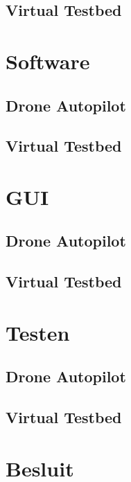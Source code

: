 \documentclass[eind]{penoverslag}
\begin{document}
\subsection{Virtual Testbed}



\section{Software}
\label{sec:Software}



\subsection{Drone Autopilot}



\subsection{Virtual Testbed}


\section{GUI}
\label{sec:GUI}



\subsection{Drone Autopilot}



\subsection{Virtual Testbed}



\section{Testen}
\label{sec:Testen}



\subsection{Drone Autopilot}



\subsection{Virtual Testbed}


\section*{Besluit}
\label{sec:Besluit}








%
\end{document}
